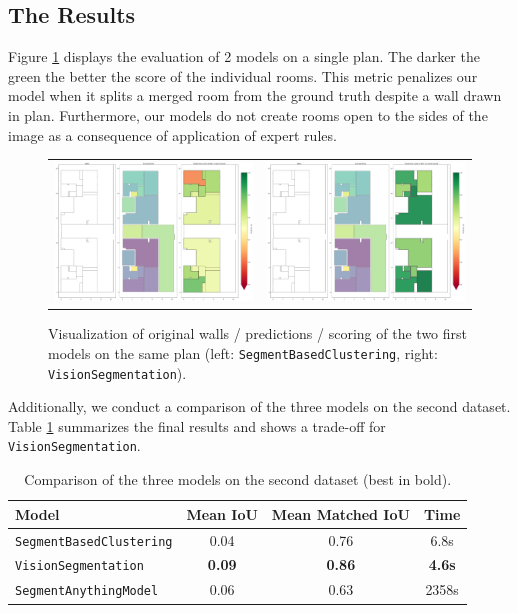 \documentclass[11pt]{article}
\begin{document}
\subsection{The Results}
Figure \ref{fig:result_segmentation} displays the evaluation of 2 models on a single 
plan. The darker the green the better the score of the individual rooms. This metric 
penalizes our model when it splits a merged room from the ground truth despite a 
wall drawn in plan. Furthermore, our models do not create rooms open to the sides
of the image as a consequence of application of expert rules.
\begin{figure}[h]
    \centering
    \begin{tabular}{cc}
        \includegraphics[width=0.45\linewidth]{figures/ScoreSeg.png} &
        \includegraphics[width=0.45\linewidth]{figures/ScoreCV.png} \\
        
    \end{tabular}
    \caption{Visualization of original walls / predictions / scoring of the two first models 
    on the same plan
    (left: \texttt{SegmentBasedClustering}, right: \texttt{VisionSegmentation}).}
    \label{fig:result_segmentation}
\end{figure}

Additionally, we conduct a comparison of the three models on the second dataset.
Table \ref{tab:results} summarizes the final results and shows a trade-off 
for \texttt{VisionSegmentation}.
\begin{table}[ht!]
    \centering
    \begin{tabular}{|l|c|c|c|}
        \hline
        \textbf{Model} & \textbf{Mean IoU} & \textbf{Mean Matched IoU} & \textbf{Time} \\
        \hline
        \texttt{SegmentBasedClustering} & 0.04 & 0.76 & 6.8s \\
        \texttt{VisionSegmentation} & \textbf{0.09} & \textbf{0.86} & \textbf{4.6s} \\
        \texttt{SegmentAnythingModel} & 0.06 & 0.63 & 2358s \\
        \hline
    \end{tabular}
    \caption{Comparison of the three models on the second dataset (best in bold).}
    \label{tab:results}
\end{table}
\end{document}
